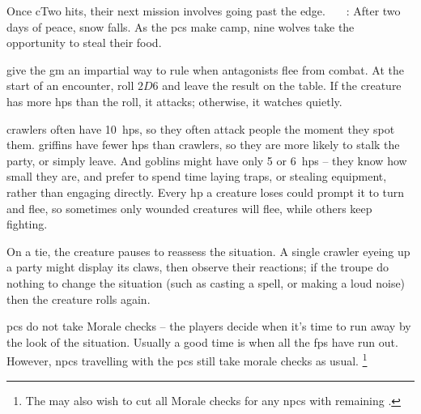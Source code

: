 \begin{multicols}{2}
{\begin{exampletext}
    Once \gls{cTwo} hits, their next mission involves going past the \gls{edge}.
    ~~~: After two days of peace, snow falls.
    As the \glspl{pc} make camp, nine wolves take the opportunity to steal their food.

  \end{exampletext}
}{
  \toggletrue{genExamples}
  \allEncounterTables
}

give the \gls{gm} an impartial way to rule when antagonists flee from combat.
At the start of an encounter, roll $2D6$ and leave the result on the table.
If the creature has more \glspl{hp} than the roll, it attacks; otherwise, it watches quietly.


\Glspl{crawler} often have 10~\glspl{hp}, so they often attack people the moment they spot them.
\Glspl{griffin} have fewer \glspl{hp} than \glspl{crawler}, so they are more likely to stalk the party, or simply leave.
And goblins might have only 5 or 6~\glspl{hp} -- they know how small they are, and prefer to spend time laying traps, or stealing equipment, rather than engaging directly.
Every \gls{hp} a creature loses could prompt it to turn and flee, so sometimes only wounded creatures will flee, while others keep fighting.

On a tie, the creature pauses to reassess the situation.
A single \gls{crawler} eyeing up a party might display its claws, then observe their reactions; if the troupe do nothing to change the situation (such as casting a spell, or making a loud noise) then the creature rolls again.

\Glspl{pc} do not take Morale checks -- the players decide when it's time to run away by the look of the situation.
Usually a good time is when all the \glspl{fp} have run out.
%
However, \glspl{npc} travelling with the \glspl{pc} still take morale checks as usual.%
\footnote{The  may also wish to cut all Morale checks for any \glspl{npc} with remaining .}%


\end{multicols}

